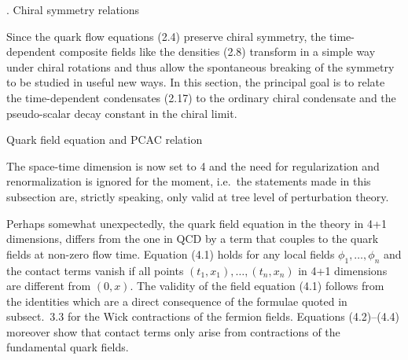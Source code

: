 

. Chiral symmetry relations

Since the quark flow equations (2.4) preserve chiral symmetry,
the time-dependent composite fields like the densities (2.8) 
transform in a simple way under chiral rotations
and thus allow the spontaneous breaking of the symmetry
to be studied in useful new ways.
In this section, the principal goal is to relate
the time-dependent condensates (2.17) to the 
ordinary chiral condensate and the pseudo-scalar decay
constant in the chiral limit.


 Quark field equation and PCAC relation

The space-time dimension is now set to 4
and the need for regularization and renormalization
is ignored for the moment, i.e.~the statements made 
in this subsection
are, strictly speaking, only valid
at tree level of perturbation theory. 

Perhaps somewhat unexpectedly, the quark field equation
in the theory in 4+1 dimensions,
differs from the one
in QCD by a term that couples to the quark fields at non-zero
flow time. Equation (4.1) holds for any
local fields $\phi_1,\ldots,\phi_n$ and the contact terms vanish
if all points $(t_1,x_1),\ldots,(t_n,x_n)$ in 4+1 dimensions 
are different from $(0,x)$.
The validity of the field equation (4.1) follows
from the identities
which are a direct consequence of the formulae quoted
in subsect.~3.3 for the Wick contractions of the fermion fields.
Equations (4.2)--(4.4) moreover show that contact terms only arise 
from contractions of the fundamental quark fields.

